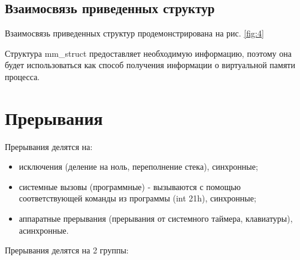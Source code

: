 \subsection{Взаимосвязь приведенных структур}

Взаимосвязь приведенных структур продемонстрирована на рис. \ref{fig:4}

\begin{figure}[ht!]
\end{figure}

Структура mm\_struct предоставляет необходимую информацию, поэтому она будет использоваться 
как способ получения информации о виртуальной памяти процесса.

\newpage

\section{Прерывания}

Прерывания делятся на:

\begin{itemize}
	\item исключения (деление на ноль, переполнение стека), синхронные;
	\item системные вызовы (программные) - вызываются с помощью соответствующей команды из программы (int 21h), синхронные;
	\item аппаратные прерывания (прерывания от системного таймера, клавиатуры), асинхронные. 
\end{itemize}

Прерывания делятся на 2 группы:

